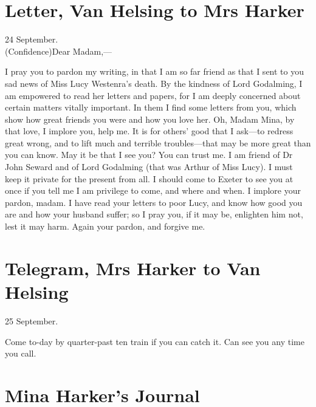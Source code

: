 \section{Letter, Van Helsing to Mrs Harker}


\begin{mail}{24 September.\\(Confidence)}{Dear Madam,— }

I pray you to pardon my writing, in that I am so far friend as that I sent to you sad news of Miss Lucy Westenra's death. By the kindness of Lord Godalming, I am empowered to read her letters and papers, for I am deeply concerned about certain matters vitally important. In them I find some letters from you, which show how great friends you were and how you love her. Oh, Madam Mina, by that love, I implore you, help me. It is for others' good that I ask—to redress great wrong, and to lift much and terrible troubles—that may be more great than you can know. May it be that I see you? You can trust me. I am friend of Dr John Seward and of Lord Godalming (that was Arthur of Miss Lucy). I must keep it private for the present from all. I should come to Exeter to see you at once if you tell me I am privilege to come, and where and when. I implore your pardon, madam. I have read your letters to poor Lucy, and know how good you are and how your husband suffer; so I pray you, if it may be, enlighten him not, lest it may harm. Again your pardon, and forgive me.

\end{mail}


\section{Telegram, Mrs Harker to Van Helsing}

\begin{telegram}{25 September.}

Come to-day by quarter-past ten train if you can catch it. Can see you any time you call.

\end{telegram}

\section{Mina Harker's Journal}
	
